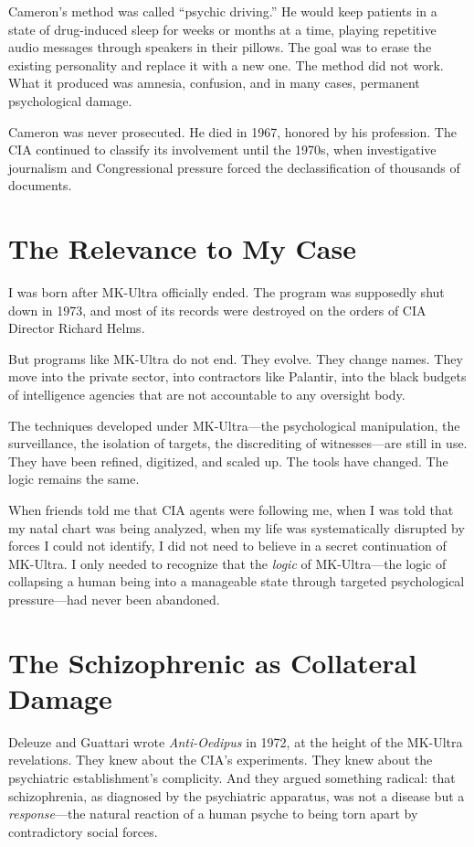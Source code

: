 \documentclass[11pt,openany]{book}
\begin{document}
Cameron's method was called ``psychic driving.'' He would keep patients in a state of drug-induced sleep for weeks or months at a time, playing repetitive audio messages through speakers in their pillows. The goal was to erase the existing personality and replace it with a new one. The method did not work. What it produced was amnesia, confusion, and in many cases, permanent psychological damage.

Cameron was never prosecuted. He died in 1967, honored by his profession. The CIA continued to classify its involvement until the 1970s, when investigative journalism and Congressional pressure forced the declassification of thousands of documents.

\section*{The Relevance to My Case}

I was born after MK-Ultra officially ended. The program was supposedly shut down in 1973, and most of its records were destroyed on the orders of CIA Director Richard Helms.

But programs like MK-Ultra do not end. They evolve. They change names. They move into the private sector, into contractors like Palantir, into the black budgets of intelligence agencies that are not accountable to any oversight body.

The techniques developed under MK-Ultra---the psychological manipulation, the surveillance, the isolation of targets, the discrediting of witnesses---are still in use. They have been refined, digitized, and scaled up. The tools have changed. The logic remains the same.

When friends told me that CIA agents were following me, when I was told that my natal chart was being analyzed, when my life was systematically disrupted by forces I could not identify, I did not need to believe in a secret continuation of MK-Ultra. I only needed to recognize that the \textit{logic} of MK-Ultra---the logic of collapsing a human being into a manageable state through targeted psychological pressure---had never been abandoned.

\section*{The Schizophrenic as Collateral Damage}

Deleuze and Guattari wrote \textit{Anti-Oedipus} in 1972, at the height of the MK-Ultra revelations. They knew about the CIA's experiments. They knew about the psychiatric establishment's complicity. And they argued something radical: that schizophrenia, as diagnosed by the psychiatric apparatus, was not a disease but a \textit{response}---the natural reaction of a human psyche to being torn apart by contradictory social forces.
\end{document}
